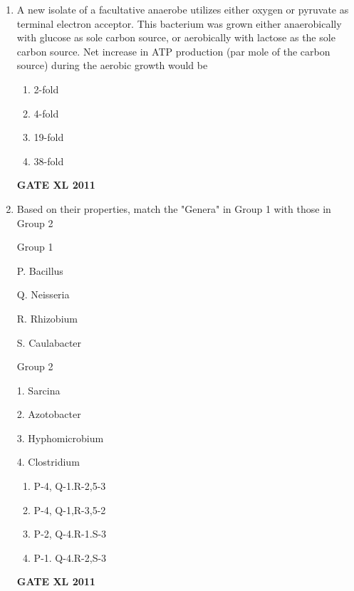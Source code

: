 \documentclass[journal,12pt,onecolumn]{IEEEtran}
\begin{document}
\begin{enumerate}
\item {A new isolate of a facultative anaerobe utilizes either oxygen or pyruvate as terminal electron acceptor. This bacterium was grown either anaerobically with glucose as sole carbon source, or aerobically with lactose as the sole carbon source. Net increase in ATP production (par mole of the carbon source) during the aerobic growth would be}
		\begin{enumerate}
			\item 2-fold
			\item 4-fold
			\item 19-fold
			\item 38-fold
		\end{enumerate}
		\hfill{\textbf{GATE XL 2011}}
\item {Based on their properties, match the "Genera" in Group 1 with those in Group 2}


	\begin{minipage}{0.5\textwidth}
	\begin{flushleft}


Group 1

P. Bacillus

Q. Neisseria

R. Rhizobium

S. Caulabacter
		\end{flushleft}
		\end{minipage}
	\begin{minipage}{0.5\textwidth}
		\begin{flushleft}

Group 2

1. Sarcina

2. Azotobacter

3. Hyphomicrobium

4. Clostridium
		\end{flushleft}
		\end{minipage}


		\begin{enumerate}
			\item P-4, Q-1.R-2,5-3
			\item P-4, Q-1,R-3,5-2
			\item P-2, Q-4.R-1.S-3
			\item P-1. Q-4.R-2,S-3
		\end{enumerate}
		\hfill{\textbf{GATE XL 2011}}


\end{enumerate}
\end{document}
